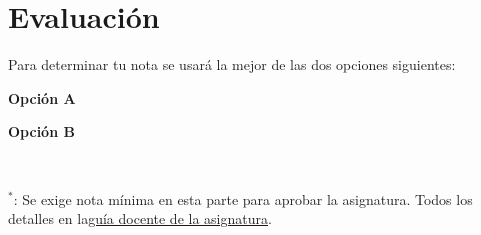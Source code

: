 \section*{Evaluación}
Para determinar tu nota se usará la mejor de las dos opciones siguientes:\\
\noindent\begin{minipage}{0.48\linewidth}
\raggedright
\textbf{Opción A}\\[0.15cm]
\end{minipage}%
\hfill
\begin{minipage}{0.36\linewidth} %
\raggedleft
\textbf{Opción B}\\[0.15cm]
\end{minipage}
\\[0.1cm]
\begin{center}
{\footnotesize $^{*}$: Se exige nota mínima en esta parte para aprobar la asignatura. Todos los detalles en la\pdfbreak \href{https://apps.uab.cat/guies/public/html/2026/assignatura/104353/es}{\underline{guía docente de la asignatura}}.}\\[0.1cm]
\end{center}
